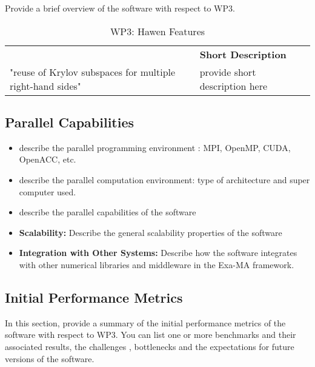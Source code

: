 Provide a brief overview of the software with respect to WP3.

\begin{table}[h!]
    \centering
    { 
        \setlength{\parindent}{0pt}
        \def\arraystretch{1.25}
        {
            \fontsize{9}{11}\selectfont
            \begin{tabular}{!{\color{numpexgray}\vrule}p{.25\linewidth}!{\color{numpexgray}\vrule}p{.6885\linewidth}!{\color{numpexgray}\vrule}}
    
     &  {\rule{0pt}{2.5ex}\color{white}\bf Short Description }\\ 
    
    "reuse of Krylov subspaces for multiple right-hand sides" & provide short description here \\
\end{tabular}
        }
    }
    \caption{WP3: Hawen Features}
\end{table}


\subsection{Parallel Capabilities}
\label{sec:WP3:Hawen:performances}


\begin{itemize}
    \item describe the parallel programming  environment : MPI, OpenMP, CUDA, OpenACC, etc.
    \item describe the parallel computation environment: type of architecture and super computer used.
    \item describe the parallel capabilities of the software
    \item \textbf{Scalability:} Describe the general scalability properties of the software
    \item \textbf{Integration with Other Systems:} Describe how the software integrates with other numerical libraries and middleware in the Exa-MA framework.
\end{itemize}

\subsection{Initial Performance Metrics}
\label{sec:WP3:Hawen:metrics}

In this section, provide a summary of the initial performance metrics of the software with respect to WP3.
You can list one or more benchmarks and their associated results, the challenges , bottlenecks and the expectations for future versions of the software.



